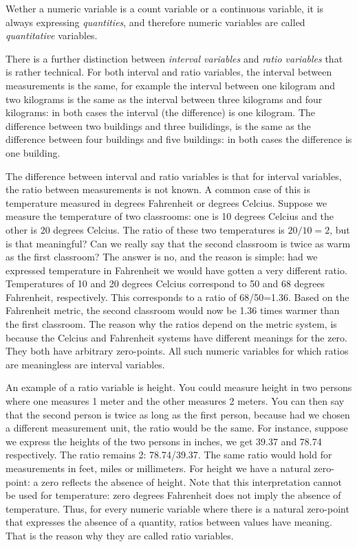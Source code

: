 \documentclass[]{report}\usepackage[]{graphicx}\usepackage[]{color}
\begin{document}
Wether a numeric variable is a count variable or a continuous variable, it is always expressing \textit{quantities}, and therefore numeric variables are called \textit{quantitative} variables. 

There is a further distinction between \textit{interval variables} and \textit{ratio variables} that is rather technical. For both interval and ratio variables, the interval between measurements is the same, for example the interval between one kilogram and two kilograms is the same as the interval between three kilograms and four kilograms: in both cases the interval (the difference) is one kilogram. The difference between two buildings and three builidings, is the same as the difference between four buildings and five buildings: in both cases the difference is one building. 

The difference between interval and ratio variables is that for interval variables, the ratio between measurements is not known. A common case of this is temperature measured in degrees Fahrenheit or degrees Celcius. Suppose we measure the temperature of two classrooms: one is 10 degrees Celcius and the other is 20 degrees Celcius. The ratio of these two temperatures is $20/10=2$, but is that meaningful? Can we really say that the second classroom is twice as warm as the first classroom? The answer is no, and the reason is simple: had we expressed temperature in Fahrenheit we would have gotten a very different ratio. Temperatures of 10 and 20 degrees Celcius correspond to 50 and 68 degrees Fahrenheit, respectively. This corresponds to a ratio of 68/50=1.36. Based on the Fahrenheit metric, the second classroom would now be 1.36 times warmer than the first classroom. The reason why the ratios depend on the metric system, is because the Celcius and Fahrenheit systems have different meanings for the zero. They both have arbitrary zero-points. All such numeric variables for which ratios are meaningless are interval variables. 

An example of a ratio variable is height. You could measure height in two persons where one measures 1 meter and the other measures 2 meters. You can then say that the second person is twice as long as the first person, because had we chosen a different measurement unit, the ratio would be the same. For instance, suppose we express the heights of the two persons in inches, we get 39.37 and 78.74 respectively. The ratio remains 2: 78.74/39.37. The same ratio would hold for measurements in feet, miles or millimeters. For height we have a natural zero-point: a zero reflects the absence of height. Note that this interpretation cannot be used for temperature: zero degrees Fahrenheit does not imply the absence of temperature. Thus, for every numeric variable where there is a natural zero-point that expresses the absence of a quantity, ratios between values have meaning. That is the reason why they are called ratio variables. 
\end{document}
